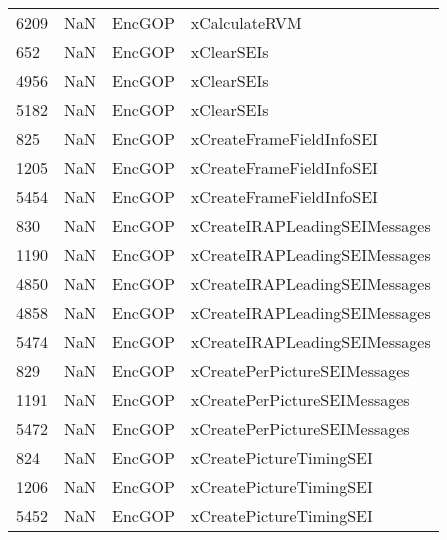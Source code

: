 \begin{tabular}{llll}
6209 &                   NaN &                     EncGOP &                             xCalculateRVM \\
652  &                   NaN &                     EncGOP &                                xClearSEIs \\
4956 &                   NaN &                     EncGOP &                                xClearSEIs \\
5182 &                   NaN &                     EncGOP &                                xClearSEIs \\
825  &                   NaN &                     EncGOP &                  xCreateFrameFieldInfoSEI \\
1205 &                   NaN &                     EncGOP &                  xCreateFrameFieldInfoSEI \\
5454 &                   NaN &                     EncGOP &                  xCreateFrameFieldInfoSEI \\
830  &                   NaN &                     EncGOP &             xCreateIRAPLeadingSEIMessages \\
1190 &                   NaN &                     EncGOP &             xCreateIRAPLeadingSEIMessages \\
4850 &                   NaN &                     EncGOP &             xCreateIRAPLeadingSEIMessages \\
4858 &                   NaN &                     EncGOP &             xCreateIRAPLeadingSEIMessages \\
5474 &                   NaN &                     EncGOP &             xCreateIRAPLeadingSEIMessages \\
829  &                   NaN &                     EncGOP &              xCreatePerPictureSEIMessages \\
1191 &                   NaN &                     EncGOP &              xCreatePerPictureSEIMessages \\
5472 &                   NaN &                     EncGOP &              xCreatePerPictureSEIMessages \\
824  &                   NaN &                     EncGOP &                   xCreatePictureTimingSEI \\
1206 &                   NaN &                     EncGOP &                   xCreatePictureTimingSEI \\
5452 &                   NaN &                     EncGOP &                   xCreatePictureTimingSEI \\

\end{tabular}
